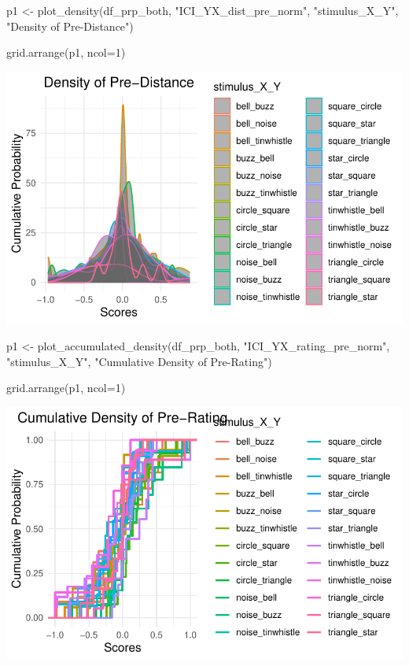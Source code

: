 \documentclass[
  letterpaper,
  DIV=11,
  numbers=noendperiod]{scrartcl}
\newenvironment{Shaded}{\begin{snugshade}}{\end{snugshade}}
\newcommand{\AttributeTok}[1]{\textcolor[rgb]{0.40,0.45,0.13}{#1}}
\newcommand{\DecValTok}[1]{\textcolor[rgb]{0.68,0.00,0.00}{#1}}
\newcommand{\FunctionTok}[1]{\textcolor[rgb]{0.28,0.35,0.67}{#1}}
\newcommand{\NormalTok}[1]{\textcolor[rgb]{0.00,0.23,0.31}{#1}}
\newcommand{\OtherTok}[1]{\textcolor[rgb]{0.00,0.23,0.31}{#1}}
\newcommand{\StringTok}[1]{\textcolor[rgb]{0.13,0.47,0.30}{#1}}
\begin{document}
\begin{Shaded}
\begin{Highlighting}[]
\NormalTok{p1 }\OtherTok{\textless{}{-}} \FunctionTok{plot\_density}\NormalTok{(df\_prp\_both, }\StringTok{"ICI\_YX\_dist\_pre\_norm"}\NormalTok{, }\StringTok{"stimulus\_X\_Y"}\NormalTok{, }\StringTok{"Density of Pre{-}Distance"}\NormalTok{)}

\FunctionTok{grid.arrange}\NormalTok{(p1, }\AttributeTok{ncol=}\DecValTok{1}\NormalTok{)}
\end{Highlighting}
\end{Shaded}

\includegraphics{index_files/figure-pdf/unnamed-chunk-25-2.pdf}

\begin{Shaded}
\begin{Highlighting}[]
\NormalTok{p1 }\OtherTok{\textless{}{-}} \FunctionTok{plot\_accumulated\_density}\NormalTok{(df\_prp\_both, }\StringTok{"ICI\_YX\_rating\_pre\_norm"}\NormalTok{, }\StringTok{"stimulus\_X\_Y"}\NormalTok{, }\StringTok{"Cumulative Density of Pre{-}Rating"}\NormalTok{)}

\FunctionTok{grid.arrange}\NormalTok{(p1, }\AttributeTok{ncol=}\DecValTok{1}\NormalTok{)}
\end{Highlighting}
\end{Shaded}

\includegraphics{index_files/figure-pdf/unnamed-chunk-26-1.pdf}
\end{document}
